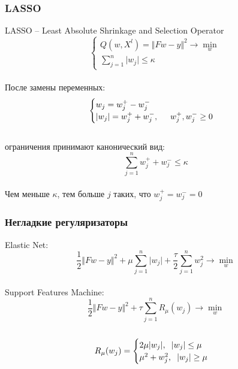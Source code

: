 \documentclass[10pt]{beamer}
\begin{document}
\begin{frame}\frametitle{LASSO}
LASSO -- Least Absolute Shrinkage and Selection Operator\\
$$
\begin{cases} Q(w,X^l) = \Vert Fw - y \Vert^2 \rightarrow \min\limits_{w} \\
\sum_{j=1}^n \vert w_j \vert \leq \kappa
\end{cases}
$$\\
После замены переменных:\\
$$
\begin{cases} w_j = w_j^+ - w_j^-\\
\vert w_j \vert = w_j^+ + w_j^-, \hspace{5mm} w_j^+, w_j^- \geq 0\\

\end{cases}
$$\\
ограничения принимают канонический вид:\\
$$\sum\limits_{j=1}^n w_j^+ + w_j^- \leq \kappa$$\\
Чем меньше $\kappa$, тем больше $j$ таких, что $w_j^+ = w_j^- = 0$\\
\end{frame}

\begin{frame}\frametitle{Негладкие регуляризаторы}
Elastic Net:\\
$$\frac{1}{2} \Vert Fw - y \Vert^2 + \mu \sum\limits_{j=1}^n \vert w_j \vert + \frac{\tau}{2} \sum\limits_{j=1}^n w_j^2 \rightarrow \min\limits_{w}$$\\
Support Features Machine:\\
$$\frac{1}{2} \Vert Fw - y \Vert^2 + \tau \sum\limits_{j=1}^n R_{\mu}(w_j) \rightarrow \min\limits_{w}$$\\
$$ R_{\mu}(w_j) = \begin{cases} 2 \mu \vert w_j \vert, \hspace{2mm} \vert w_j \vert \leq \mu\\
\mu^2 + w_j^2, \hspace{2mm} \vert w_j \vert \geq \mu
\end{cases}$$\\
\end{frame}
\end{document}

